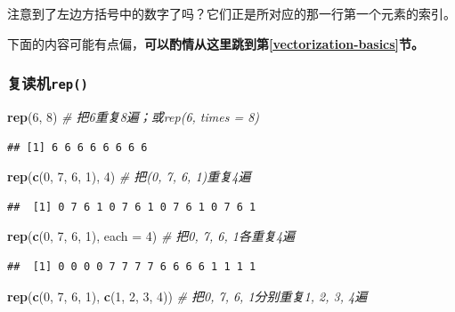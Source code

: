 \documentclass[]{book}
\newenvironment{Shaded}{\begin{snugshade}}{\end{snugshade}}
\newcommand{\CommentTok}[1]{\textcolor[rgb]{0.56,0.35,0.01}{\textit{#1}}}
\newcommand{\DataTypeTok}[1]{\textcolor[rgb]{0.13,0.29,0.53}{#1}}
\newcommand{\DecValTok}[1]{\textcolor[rgb]{0.00,0.00,0.81}{#1}}
\newcommand{\KeywordTok}[1]{\textcolor[rgb]{0.13,0.29,0.53}{\textbf{#1}}}
\newcommand{\NormalTok}[1]{#1}
\begin{document}
注意到了左边方括号中的数字了吗？它们正是所对应的那一行第一个元素的索引。

下面的内容可能有点偏，\textbf{可以酌情从这里跳到第\ref{vectorization-basics}节。}

\hypertarget{rep}{%
\subsubsection{\texorpdfstring{复读机\texttt{rep()}}{复读机rep()}}\label{rep}}

\begin{Shaded}
\begin{Highlighting}[]
\KeywordTok{rep}\NormalTok{(}\DecValTok{6}\NormalTok{, }\DecValTok{8}\NormalTok{) }\CommentTok{# 把6重复8遍；或rep(6, times = 8)}
\end{Highlighting}
\end{Shaded}

\begin{verbatim}
## [1] 6 6 6 6 6 6 6 6
\end{verbatim}

\begin{Shaded}
\begin{Highlighting}[]
\KeywordTok{rep}\NormalTok{(}\KeywordTok{c}\NormalTok{(}\DecValTok{0}\NormalTok{, }\DecValTok{7}\NormalTok{, }\DecValTok{6}\NormalTok{, }\DecValTok{1}\NormalTok{), }\DecValTok{4}\NormalTok{) }\CommentTok{# 把(0, 7, 6, 1)重复4遍}
\end{Highlighting}
\end{Shaded}

\begin{verbatim}
##  [1] 0 7 6 1 0 7 6 1 0 7 6 1 0 7 6 1
\end{verbatim}

\begin{Shaded}
\begin{Highlighting}[]
\KeywordTok{rep}\NormalTok{(}\KeywordTok{c}\NormalTok{(}\DecValTok{0}\NormalTok{, }\DecValTok{7}\NormalTok{, }\DecValTok{6}\NormalTok{, }\DecValTok{1}\NormalTok{), }\DataTypeTok{each =} \DecValTok{4}\NormalTok{) }\CommentTok{# 把0, 7, 6, 1各重复4遍}
\end{Highlighting}
\end{Shaded}

\begin{verbatim}
##  [1] 0 0 0 0 7 7 7 7 6 6 6 6 1 1 1 1
\end{verbatim}

\begin{Shaded}
\begin{Highlighting}[]
\KeywordTok{rep}\NormalTok{(}\KeywordTok{c}\NormalTok{(}\DecValTok{0}\NormalTok{, }\DecValTok{7}\NormalTok{, }\DecValTok{6}\NormalTok{, }\DecValTok{1}\NormalTok{), }\KeywordTok{c}\NormalTok{(}\DecValTok{1}\NormalTok{, }\DecValTok{2}\NormalTok{, }\DecValTok{3}\NormalTok{, }\DecValTok{4}\NormalTok{)) }\CommentTok{# 把0, 7, 6, 1分别重复1, 2, 3, 4遍}
\end{Highlighting}
\end{Shaded}
\end{document}

